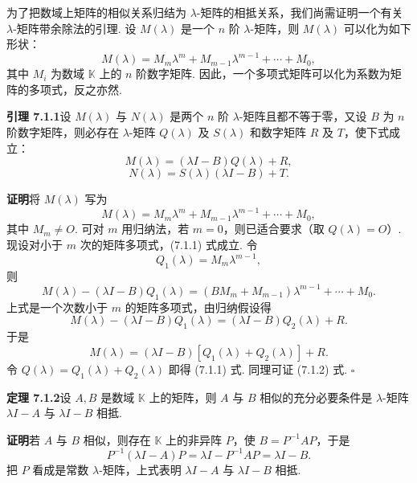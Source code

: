 \documentclass[UTF8, 12pt, fontset=fandol, oneside]{ctexart}
\begin{document}
为了把数域上矩阵的相似关系归结为 $\lambda$-矩阵的相抵关系，我们尚需证明一个有关 $\lambda$-矩阵带余除法的引理. 设 $M(\lambda)$ 是一个 $n$ 阶 $\lambda$-矩阵，则 $M(\lambda)$ 可以化为如下形状：
\[
M(\lambda)=M_m\lambda^m+M_{m-1}\lambda^{m-1}+\cdots+M_0,
\]
其中 $M_i$ 为数域 $\mathbb{K}$ 上的 $n$ 阶数字矩阵. 因此，一个多项式矩阵可以化为系数为矩阵的多项式，反之亦然.

\noindent\textbf{引理 7.1.1}\quad 设 $M(\lambda)$ 与 $N(\lambda)$ 是两个 $n$ 阶 $\lambda$-矩阵且都不等于零，又设 $B$ 为 $n$ 阶数字矩阵，则必存在 $\lambda$-矩阵 $Q(\lambda)$ 及 $S(\lambda)$ 和数字矩阵 $R$ 及 $T$，使下式成立：
\begin{equation}
M(\lambda)=(\lambda I-B)Q(\lambda)+R,
\tag{7.1.1}
\end{equation}
\begin{equation}
N(\lambda)=S(\lambda)(\lambda I-B)+T.
\tag{7.1.2}
\end{equation}

\noindent\textbf{证明}\quad 将 $M(\lambda)$ 写为
\[
M(\lambda)=M_m\lambda^m+M_{m-1}\lambda^{m-1}+\cdots+M_0,
\]
其中 $M_m\neq O$. 可对 $m$ 用归纳法，若 $m=0$，则已适合要求（取 $Q(\lambda)=O$）. 现设对小于 $m$ 次的矩阵多项式，(7.1.1) 式成立. 令
\[
Q_1(\lambda)=M_m\lambda^{m-1},
\]
则
\begin{equation}
M(\lambda)-(\lambda I-B)Q_1(\lambda)=(BM_m+M_{m-1})\lambda^{m-1}+\cdots+M_0.
\tag{7.1.3}
\end{equation}
上式是一个次数小于 $m$ 的矩阵多项式，由归纳假设得
\[
M(\lambda)-(\lambda I-B)Q_1(\lambda)=(\lambda I-B)Q_2(\lambda)+R.
\]
于是
\[
M(\lambda)=(\lambda I-B)\left[Q_1(\lambda)+Q_2(\lambda)\right]+R.
\]
令 $Q(\lambda)=Q_1(\lambda)+Q_2(\lambda)$ 即得 (7.1.1) 式. 同理可证 (7.1.2) 式. $\square$

\noindent\textbf{定理 7.1.2}\quad 设 $A,B$ 是数域 $\mathbb{K}$ 上的矩阵，则 $A$ 与 $B$ 相似的充分必要条件是 $\lambda$-矩阵 $\lambda I-A$ 与 $\lambda I-B$ 相抵.

\noindent\textbf{证明}\quad 若 $A$ 与 $B$ 相似，则存在 $\mathbb{K}$ 上的非异阵 $P$，使 $B=P^{-1}AP$，于是
\begin{equation}
P^{-1}(\lambda I-A)P=\lambda I-P^{-1}AP=\lambda I-B.
\tag{7.1.4}
\end{equation}
把 $P$ 看成是常数 $\lambda$-矩阵，上式表明 $\lambda I-A$ 与 $\lambda I-B$ 相抵.
\end{document}
